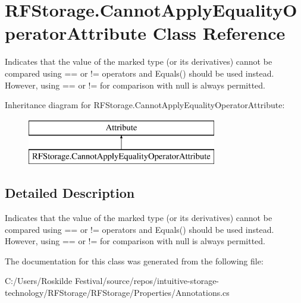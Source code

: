 \section{R\+F\+Storage.\+Cannot\+Apply\+Equality\+Operator\+Attribute Class Reference}
\label{class_r_f_storage_1_1_cannot_apply_equality_operator_attribute}


Indicates that the value of the marked type (or its derivatives) cannot be compared using \textquotesingle{}==\textquotesingle{} or \textquotesingle{}!=\textquotesingle{} operators and {\ttfamily Equals()} should be used instead. However, using \textquotesingle{}==\textquotesingle{} or \textquotesingle{}!=\textquotesingle{} for comparison with {\ttfamily null} is always permitted.  


Inheritance diagram for R\+F\+Storage.\+Cannot\+Apply\+Equality\+Operator\+Attribute\+:\begin{figure}[H]
\begin{center}
\leavevmode
\includegraphics[height=2.000000cm]{class_r_f_storage_1_1_cannot_apply_equality_operator_attribute}
\end{center}
\end{figure}


\subsection{Detailed Description}
Indicates that the value of the marked type (or its derivatives) cannot be compared using \textquotesingle{}==\textquotesingle{} or \textquotesingle{}!=\textquotesingle{} operators and {\ttfamily Equals()} should be used instead. However, using \textquotesingle{}==\textquotesingle{} or \textquotesingle{}!=\textquotesingle{} for comparison with {\ttfamily null} is always permitted. 


\begin{DoxyCode}{0}
\DoxyCodeLine{[CannotApplyEqualityOperator]}
\DoxyCodeLine{}
\DoxyCodeLine{    \}}
\DoxyCodeLine{  \}}
\DoxyCodeLine{\}}
\end{DoxyCode}


The documentation for this class was generated from the following file\+:\begin{DoxyCompactItemize}
\item 
C\+:/\+Users/\+Roskilde Festival/source/repos/intuitive-\/storage-\/technology/\+R\+F\+Storage/\+R\+F\+Storage/\+Properties/Annotations.\+cs\end{DoxyCompactItemize}
